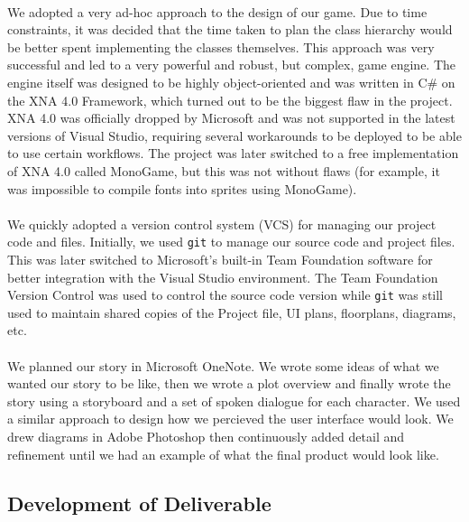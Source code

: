 \documentclass{article}
\begin{document}
\paragraph{}
We adopted a very ad-hoc approach to the design of our game. Due to time constraints, it was decided that the time taken to plan the class hierarchy would be better spent implementing the classes themselves. This approach was very successful and led to a very powerful and robust, but complex, game engine. The engine itself was designed to be highly object-oriented and was written in C\# on the XNA 4.0 Framework, which turned out to be the biggest flaw in the project. XNA 4.0 was officially dropped by Microsoft and was not supported in the latest versions of Visual Studio, requiring several workarounds to be deployed to be able to use certain workflows. The project was later switched to a free implementation of XNA 4.0 called MonoGame, but this was not without flaws (for example, it was impossible to compile fonts into sprites using MonoGame). 
\paragraph{}
We quickly adopted a version control system (VCS) for managing our project code and files. Initially, we used \texttt{git} to manage our source code and project files. This was later switched to Microsoft's built-in Team Foundation software for better integration with the Visual Studio environment. The Team Foundation Version Control was used to control the source code version while \texttt{git} was still used to maintain shared copies of the Project file, UI plans, floorplans, diagrams, etc.
\paragraph{}
We planned our story in Microsoft OneNote\cite{story}. We wrote some ideas of what we wanted our story to be like, then we wrote a plot overview and finally wrote the story using a storyboard and a set of spoken dialogue for each character. We used a similar approach to design how we percieved the user interface would look. We drew diagrams in Adobe Photoshop then continuously added detail and refinement until we had an example of what the final product would look like. 
\subsection {Development of Deliverable} %
\end{document}
